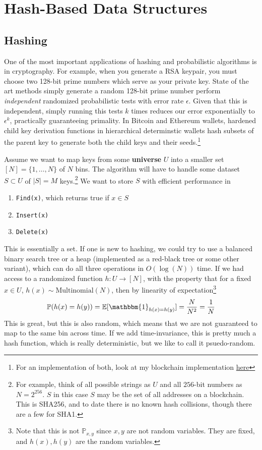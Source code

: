 \section{Hash-Based Data Structures} 

\subsection{Hashing}

  One of the most important applications of hashing and probabilistic algorithms is in cryptography. For example, when you generate a RSA keypair, you must choose two 128-bit prime numbers which serve as your private key. State of the art methods simply generate a random 128-bit prime number perform \textit{independent} randomized probabilistic tests with error rate $\epsilon$. Given that this is independent, simply running this tests $k$ times reduces our error exponentially to $\epsilon^k$, practically guaranteeing primality. In Bitcoin and Ethereum wallets, hardened child key derivation functions in hierarchical determinstic wallets hash subsets of the parent key to generate both the child keys and their seeds.\footnote{For an implementation of both, look at my blockchain implementation \href{https://github.com/mbahng/blade/blob/main/backend/src/crypt/primes.js\#L61}{here}} 

  Assume we want to map keys from some \textbf{universe} $U$ into a smaller set $[N] = \{1, \ldots, N\}$ of $N$ bins. The algorithm will have to handle some dataset $S \subset U$ of $|S| = M$ keys.\footnote{For example, think of all possible strings as $U$ and all $256$-bit numbers as $N = 2^{256}$. $S$ in this case $S$ may be the set of all addresses on a blockchain. This is SHA256, and to date there is no known hash collisions, though there are a few for SHA1.} We want to store $S$ with efficient performance in 
  \begin{enumerate}
    \item \texttt{Find(x)}, which returns true if $x \in S$
    \item \texttt{Insert(x)} 
    \item \texttt{Delete(x)}
    \end{enumerate}
  This is essentially a set. If one is new to hashing, we could try to use a balanced binary search tree or a heap (implemented as a red-black tree or some other variant), which can do all three operations in $O(\log(N))$ time. If we had access to a randomized function $h: U \rightarrow [N]$, with the property that for a fixed $x \in U$, $h(x) \sim \mathrm{Multinomial}(N)$, then by linearity of expectation\footnote{Note that this is not $\mathbb{P}_{x, y}$ since $x, y$ are not random variables. They are fixed, and $h(x), h(y)$ are the random variables. }
  \begin{equation}
    \mathbb{P}(h(x) = h(y)) = \mathbb{E}[\mathbbm{1}_{h(x) = h(y)}] = \frac{N}{N^2} = \frac{1}{N}
  \end{equation}
  This is great, but this is also random, which means that we are not guaranteed to map to the same bin across time. If we add time-invariance, this is pretty much a hash function, which is really deterministic, but we like to call it psuedo-random. 

